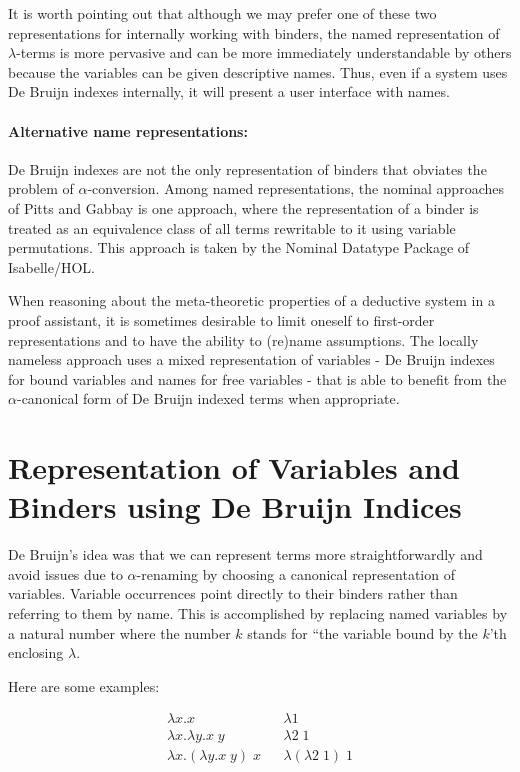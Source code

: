 It is worth pointing out that although we may prefer one of these two
representations for internally working with binders, the named
representation of $\lambda$-terms is more pervasive and can be more
immediately understandable by others because the variables can be
given descriptive names. Thus, even if a system uses De Bruijn indexes
internally, it will present a user interface with names.


\paragraph{Alternative name representations:}
De Bruijn indexes are not the only representation of binders that
obviates the problem of $\alpha$-conversion. Among named
representations, the nominal approaches of Pitts and Gabbay
\cite{Gabbay:LICS99} is one approach, where the representation of a
binder is treated as an equivalence class of all terms rewritable to
it using variable permutations. This approach is taken by the Nominal
Datatype Package of Isabelle/HOL.

When reasoning about the meta-theoretic properties of a deductive
system in a proof assistant, it is sometimes desirable to limit
oneself to first-order representations and to have the ability to
(re)name assumptions. The locally nameless approach
\cite{Aydemir:POPL08} uses a mixed representation of variables - De Bruijn indexes for bound variables and
names for free variables - that is able to benefit from the
$\alpha$-canonical form of De Bruijn indexed terms when appropriate.


\section{Representation of Variables and Binders using De Bruijn Indices}

De Bruijn's idea was that we can represent terms more
straightforwardly and avoid issues due to $\alpha$-renaming by
choosing a canonical representation of variables. Variable occurrences
point directly to their binders rather than referring to them by
name. This is accomplished by replacing named variables by a natural
number where the number $k$ stands for ``the variable bound by the
$k$'th enclosing $\lambda$.

Here are some examples:

\[
\begin{array}{lcl}
\lambda x. x  & & \lambda 1 \\
\lambda x. \lambda y . x\;y & & \lambda 2\; 1\\
\lambda x. (\lambda y. x \; y)\; x & & \lambda (\lambda 2\;1) \;1
\end{array}
\]

